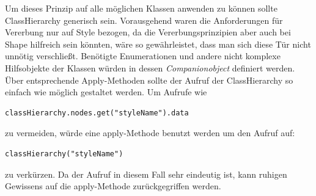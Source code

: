 Um dieses Prinzip auf alle möglichen Klassen anwenden zu können sollte ClassHierarchy generisch sein. Vorausgehend waren die Anforderungen für Vererbung nur auf Style bezogen, da die Vererbungsprinzipien aber auch bei Shape hilfreich sein könnten, wäre so gewährleistet, dass man sich diese Tür nicht unnötig verschließt. 
Benötigte Enumerationen und andere nicht komplexe Hilfsobjekte der Klassen würden in dessen \textit{Companionobject} definiert werden. 
Über entsprechende Apply-Methoden sollte der Aufruf der ClassHierarchy so einfach wie möglich gestaltet werden. Um Aufrufe wie
\begin{lstlisting}[style=scala, aboveskip=0pt]
classHierarchy.nodes.get("styleName").data
\end{lstlisting}
zu vermeiden, würde eine apply-Methode benutzt werden um den Aufruf auf:
\begin{lstlisting}[style=scala, aboveskip=0pt]
classHierarchy("styleName")
\end{lstlisting}
zu verkürzen. Da der Aufruf in diesem Fall sehr eindeutig ist, kann ruhigen Gewissens auf die apply-Methode zurückgegriffen werden. \citet[p. 76 Fazit]{esser:scala}

